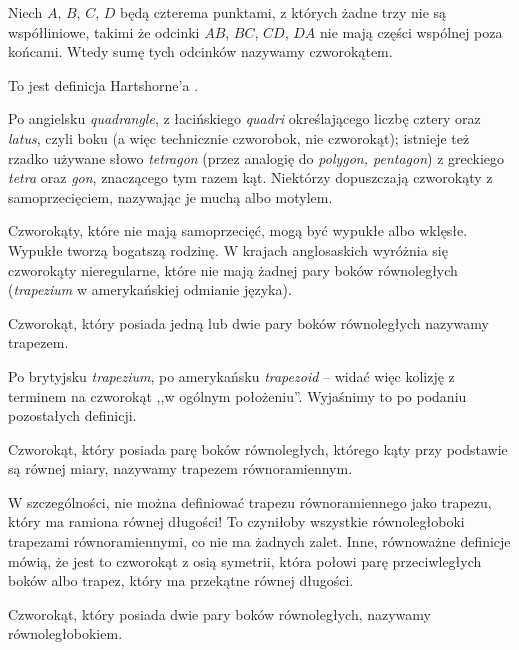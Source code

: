 %

\begin{definition}[czworokąt]
    Niech $A$, $B$, $C$, $D$ będą czterema punktami, z których żadne trzy nie są współliniowe, takimi że odcinki $AB$, $BC$, $CD$, $DA$ nie mają części wspólnej poza końcami.
    Wtedy sumę tych odcinków nazywamy czworokątem.
\end{definition}

To jest definicja Hartshorne'a \cite[s. 80]{hartshorne2000}.

Po angielsku \emph{quadrangle}, z łacińskiego \emph{quadri} określającego liczbę cztery oraz \emph{latus}, czyli boku (a więc technicznie czworobok, nie czworokąt); istnieje też rzadko używane słowo \emph{tetragon} (przez analogię do \emph{polygon, pentagon}) z greckiego \emph{tetra} oraz \emph{gon}, znaczącego tym razem kąt.
Niektórzy dopuszczają czworokąty z samoprzecięciem, nazywając je muchą albo motylem.

Czworokąty, które nie mają samoprzecięć, mogą być wypukłe albo wklęsłe.
Wypukłe tworzą bogatszą rodzinę.
W krajach anglosaskich wyróżnia się czworokąty nieregularne, które nie mają żadnej pary boków równoległych (\emph{trapezium} w amerykańskiej odmianie języka).

\begin{definition}[trapez]
	Czworokąt, który posiada jedną lub dwie pary boków równoległych nazywamy trapezem.
\end{definition}

Po brytyjsku \emph{trapezium}, po amerykańsku \emph{trapezoid} -- widać więc kolizję z terminem na czworokąt ,,w ogólnym położeniu''.
Wyjaśnimy to po podaniu pozostałych definicji.

\begin{definition}
	Czworokąt, który posiada parę boków równoległych, którego kąty przy podstawie są równej miary, nazywamy trapezem równoramiennym.
\end{definition}

W szczególności, nie można definiować trapezu równoramiennego jako trapezu, który ma ramiona równej długości!
To czyniłoby wszystkie równoległoboki trapezami równoramiennymi, co nie ma żadnych zalet.
Inne, równoważne definicje mówią, że jest to czworokąt z osią symetrii, która połowi parę przeciwległych boków albo trapez, który ma przekątne równej długości.

\begin{definition}[równoległobok]
	Czworokąt, który posiada dwie pary boków równoległych, nazywamy równoległobokiem.
\end{definition}

